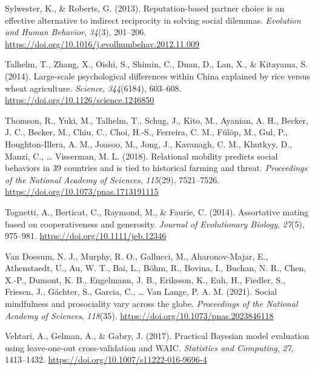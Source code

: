 \documentclass[
  man,floatsintext]{apa6}
\newlength{\cslhangindent}
\newlength{\cslentryspacingunit} %
\newenvironment{CSLReferences}[2] %
 {%
  \setlength{\parindent}{0pt}
  \ifodd #1
  \let\oldpar\par
  \def\par{\hangindent=\cslhangindent\oldpar}
  \fi
  \setlength{\parskip}{#2\cslentryspacingunit}
 }%
 {}
\begin{document}
\begin{CSLReferences}{1}{0}
\leavevmode{}%
Sylwester, K., \& Roberts, G. (2013). Reputation-based partner choice is an effective alternative to indirect reciprocity in solving social dilemmas. \emph{Evolution and Human Behavior}, \emph{34}(3), 201--206. \url{https://doi.org/10.1016/j.evolhumbehav.2012.11.009}

\leavevmode{}%
Talhelm, T., Zhang, X., Oishi, S., Shimin, C., Duan, D., Lan, X., \& Kitayama, S. (2014). Large-scale psychological differences within {C}hina explained by rice versus wheat agriculture. \emph{Science}, \emph{344}(6184), 603--608. \url{https://doi.org/10.1126/science.1246850}

\leavevmode{}%
Thomson, R., Yuki, M., Talhelm, T., Schug, J., Kito, M., Ayanian, A. H., Becker, J. C., Becker, M., Chiu, C., Choi, H.-S., Ferreira, C. M., Fülöp, M., Gul, P., Houghton-Illera, A. M., Joasoo, M., Jong, J., Kavanagh, C. M., Khutkyy, D., Manzi, C., \ldots{} Visserman, M. L. (2018). Relational mobility predicts social behaviors in 39 countries and is tied to historical farming and threat. \emph{Proceedings of the National Academy of Sciences}, \emph{115}(29), 7521--7526. \url{https://doi.org/10.1073/pnas.1713191115}

\leavevmode{}%
Tognetti, A., Berticat, C., Raymond, M., \& Faurie, C. (2014). Assortative mating based on cooperativeness and generosity. \emph{Journal of Evolutionary Biology}, \emph{27}(5), 975--981. \url{https://doi.org/10.1111/jeb.12346}

\leavevmode{}%
Van Doesum, N. J., Murphy, R. O., Gallucci, M., Aharonov-Majar, E., Athenstaedt, U., Au, W. T., Bai, L., Böhm, R., Bovina, I., Buchan, N. R., Chen, X.-P., Dumont, K. B., Engelmann, J. B., Eriksson, K., Euh, H., Fiedler, S., Friesen, J., Gächter, S., Garcia, C., \ldots{} Van Lange, P. A. M. (2021). Social mindfulness and prosociality vary across the globe. \emph{Proceedings of the National Academy of Sciences}, \emph{118}(35). \url{https://doi.org/10.1073/pnas.2023846118}

\leavevmode{}%
Vehtari, A., Gelman, A., \& Gabry, J. (2017). Practical {B}ayesian model evaluation using leave-one-out cross-validation and {WAIC}. \emph{Statistics and Computing}, \emph{27}, 1413--1432. \url{https://doi.org/10.1007/s11222-016-9696-4}


\end{CSLReferences}
\end{document}
